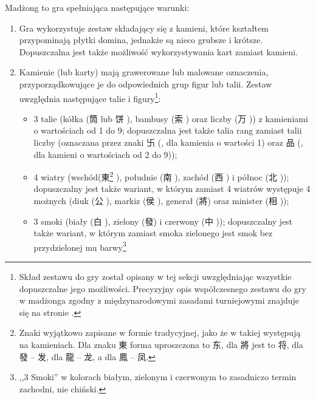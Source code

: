 \mahjongdef
\label{definicja}
Madżong to gra spełniająca %
następujące warunki:

\begin{enumerate}[label={\alph*)}] \item Gra wykorzystuje zestaw składający się
z kamieni, które kształtem przypominają płytki domina, jednakże są nieco grubsze
i krótsze. Dopuszczalna jest także możliwość wykorzystywania kart zamiast
kamieni.
\item Kamienie (lub karty) mają grawerowane lub malowane oznaczenia,
przyporządkowujące je do odpowiednich grup figur lub talii. Zestaw uwzględnia
następujące talie i figury\footnote{Skład zestawu do gry został opisany w tej
sekcji uwzględniając wszystkie dopuszczalne jego możliwości.
Precyzyjny opis współczesnego zestawu do gry w madżonga zgodny z
międzynarodowymi zasadami turniejowymi znajduje się  na stronie
\pageref{guobiao_zestaw}.}:
	\begin{itemize}
	  \item 3 talie (kółka (筒  lub 饼 ), bambusy (索
	  ) oraz liczby (万 )) z kamieniami o
wartościach od 1 do 9; dopuszczalna jest także talia rang zamiast talii liczby
(oznaczana przez znaki 卐 (, dla kamienia o wartości 1) oraz 品 
(, dla kamieni o wartościach od 2 do 9)); 
\item 4 wiatry \label{wiatry}
(wschód(東\footnote{\label{definicja_tradycyjne}Znaki wyjątkowo zapisane w formie tradycyjnej, jako że w takiej występują na kamieniach. Dla znaku 東  forma
uproszczona to 东, dla 將 jest to 将, dla 發 -- 发, dla 龍 -- 龙, a dla 鳳 -- 凤.} 
), południe (南 ), zachód (西 ) i północ (北
));  dopuszczalny jest także wariant, w którym zamiast 4 wiatrów
występuje 4 możnych (diuk (公 ),  markiz (侯 ),  generał
(將\footnotemark[2] ) oraz minister (相 ));
	  \item 3 smoki (biały (白 ), zielony (發\footnotemark[2]
	  ) i czerwony (中 )); dopuszczalny jest także wariant,
	  w którym zamiast smoka zielonego jest smok bez przydzielonej mu
	  barwy\footnote{,,3 Smoki'' w kolorach białym, zielonym i czerwonym to
	  zasadniczo termin zachodni, nie chiński.
}
\end{itemize}
\end{enumerate}
